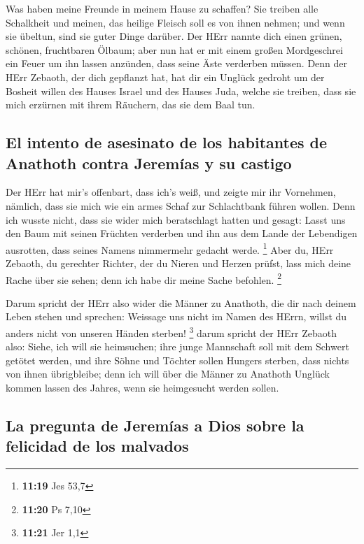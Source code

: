 Was haben meine Freunde in meinem Hause zu schaffen? Sie
treiben alle Schalkheit und meinen, das heilige Fleisch soll es von
ihnen nehmen; und wenn sie übeltun, sind sie guter Dinge darüber.
 Der HErr nannte dich einen grünen, schönen, fruchtbaren
Ölbaum; aber nun hat er mit einem großen Mordgeschrei ein Feuer um ihn
lassen anzünden, dass seine Äste verderben müssen.  Denn
der HErr Zebaoth, der dich gepflanzt hat, hat dir ein Unglück gedroht um
der Bosheit willen des Hauses Israel und des Hauses Juda, welche sie
treiben, dass sie mich erzürnen mit ihrem Räuchern, das sie dem Baal
tun.

\hypertarget{el-intento-de-asesinato-de-los-habitantes-de-anathoth-contra-jeremuxedas-y-su-castigo}{%
\subsection{El intento de asesinato de los habitantes de Anathoth contra
Jeremías y su
castigo}\label{el-intento-de-asesinato-de-los-habitantes-de-anathoth-contra-jeremuxedas-y-su-castigo}}

 Der HErr hat mir's offenbart, dass ich's weiß, und
zeigte mir ihr Vornehmen,  nämlich, dass sie mich wie ein
armes Schaf zur Schlachtbank führen wollen. Denn ich wusste nicht, dass
sie wider mich beratschlagt hatten und gesagt: Lasst uns den Baum mit
seinen Früchten verderben und ihn aus dem Lande der Lebendigen
ausrotten, dass seines Namens nimmermehr gedacht werde. \footnote{\textbf{11:19}
  Jes 53,7}  Aber du, HErr Zebaoth, du gerechter Richter,
der du Nieren und Herzen prüfst, lass mich deine Rache über sie sehen;
denn ich habe dir meine Sache befohlen. \footnote{\textbf{11:20} Ps 7,10}

 Darum spricht der HErr also wider die Männer zu
Anathoth, die dir nach deinem Leben stehen und sprechen: Weissage uns
nicht im Namen des HErrn, willst du anders nicht von unseren Händen
sterben! \footnote{\textbf{11:21} Jer 1,1}  darum spricht
der HErr Zebaoth also: Siehe, ich will sie heimsuchen; ihre junge
Mannschaft soll mit dem Schwert getötet werden, und ihre Söhne und
Töchter sollen Hungers sterben, dass nichts von ihnen übrigbleibe;
 denn ich will über die Männer zu Anathoth Unglück kommen
lassen des Jahres, wenn sie heimgesucht werden sollen.

\hypertarget{la-pregunta-de-jeremuxedas-a-dios-sobre-la-felicidad-de-los-malvados}{%
\subsection{La pregunta de Jeremías a Dios sobre la felicidad de los
malvados}\label{la-pregunta-de-jeremuxedas-a-dios-sobre-la-felicidad-de-los-malvados}}

